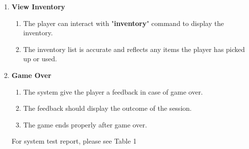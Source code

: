 \documentclass{article}
\begin{document}
\begin{enumerate}
    \item \textbf{View Inventory}
\begin{enumerate}
    \item The player can interact with "\textbf{inventory}" command to display the inventory.
    \item The inventory list is accurate and reflects any items the player has picked up or used.
\end{enumerate}

\item \textbf{Game Over}
\begin{enumerate}
    \item The system give the player a feedback in case of game over.
    \item The feedback should display the outcome of the session.
    \item The game ends properly after game over.
\end{enumerate}


For system test report, please see Table 1


\end{enumerate}
\end{document}
